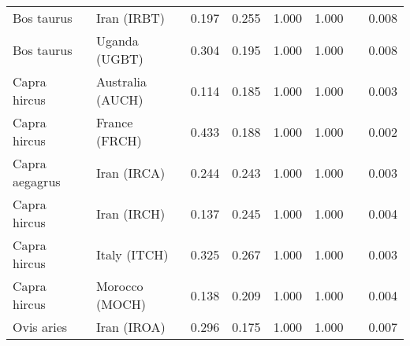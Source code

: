 \begin{center}
\begin{adjustbox}{width = 1\textwidth}
\begin{tabular}{|l|l|r|r|r|r|r|}
          Bos taurus &                     Iran (IRBT) &                                              0.197 &                                              0.255 &                1.000 &                                  1.000~~ &              0.008 \\
          Bos taurus &                   Uganda (UGBT) &                                              0.304 &                                              0.195 &                1.000 &                                  1.000~~ &              0.008 \\
        Capra hircus &                Australia (AUCH) &                                              0.114 &                                              0.185 &                1.000 &                                  1.000~~ &              0.003 \\
        Capra hircus &                   France (FRCH) &                                              0.433 &                                              0.188 &                1.000 &                                  1.000~~ &              0.002 \\
      Capra aegagrus &                     Iran (IRCA) &                                              0.244 &                                              0.243 &                1.000 &                                  1.000~~ &              0.003 \\
        Capra hircus &                     Iran (IRCH) &                                              0.137 &                                              0.245 &                1.000 &                                  1.000~~ &              0.004 \\
        Capra hircus &                    Italy (ITCH) &                                              0.325 &                                              0.267 &                1.000 &                                  1.000~~ &              0.003 \\
        Capra hircus &                  Morocco (MOCH) &                                              0.138 &                                              0.209 &                1.000 &                                  1.000~~ &              0.004 \\
          Ovis aries &                     Iran (IROA) &                                              0.296 &                                              0.175 &                1.000 &                                  1.000~~ &              0.007 \\

\end{tabular}
\end{adjustbox}
\end{center}
